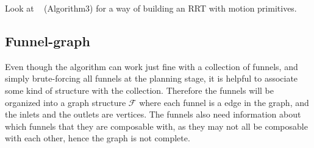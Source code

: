 Look at ~\cite{vonasekGlobalMotionPlanning2013} (Algorithm3) for a way of
building an RRT with motion primitives.

\subsection{Funnel-graph}

Even though the \rrtfunnel{} algorithm can work just fine with a collection of
funnels, and simply brute-forcing all funnels at the planning stage, it is
helpful to associate some kind of structure with the collection. Therefore the
funnels will be organized into a graph structure \(\mathcal{F}\) where each
funnel is a edge in the graph, and the inlets and the outlets are vertices. The
funnels also need information about which funnels that they are composable with,
as they may not all be composable with each other, hence the graph is not
complete.

